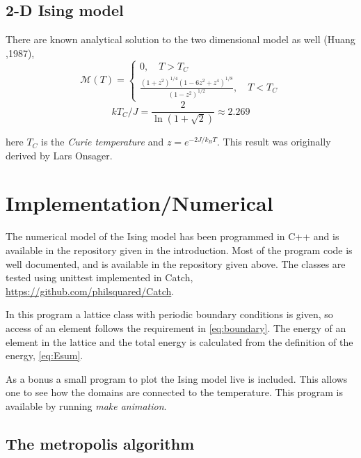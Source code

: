 \documentclass[11pt,a4paper,draft]{article}
\numberwithin{equation}{section}
\newcommand{\magM}{\mathcal{M}}
\begin{document}
\subsection{2-D Ising model}
There are known analytical solution to the two dimensional model as well (Huang ,1987),
\begin{equation}
\magM (T) = \begin{cases} 0, \quad T > T_C \\ \frac{(1+z^2)^{1/4} (1-6z^2 + z^4 )^{1/8} }{(1-z^2)^{1/2}}, \quad T < T_C \end{cases}
\end{equation}
\begin{equation}
k T_C/J = \frac{2}{\ln(1+ \sqrt{2}) } \approx 2.269
\end{equation}

here $T_C$ is the \emph{Curie temperature} and $z = e^{-2J/k_B T}$. This result was originally derived by Lars Onsager.

\section{Implementation/Numerical}

The numerical model of the Ising model has been programmed in C++ and is 
available in the repository given in the introduction.
Most of the program code is well documented, and is available in the 
repository given above. The classes are tested using unittest 
implemented in Catch, \url{https://github.com/philsquared/Catch}.

In this program a lattice class with periodic boundary conditions is given,
so access of an element follows the requirement in \eqref{eq:boundary}.
The energy of an element in the 
lattice and the total energy is calculated from the definition
of the energy, \eqref{eq:Esum}.

As a bonus a small program to plot the Ising model live is included. 
This allows one to see how the domains are connected to the temperature.
This program is available by running \emph{make animation}.


\subsection{The metropolis algorithm}
\end{document}
